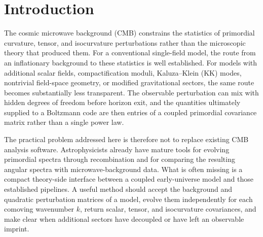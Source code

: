 \documentclass[aps,prd,twocolumn,superscriptaddress,nofootinbib,longbibliography,floatfix]{revtex4-2}
\begin{document}
\maketitle

\section{Introduction}
The cosmic microwave background (CMB) constrains the statistics of primordial curvature, tensor, and isocurvature perturbations rather than the microscopic theory that produced them.  For a conventional single-field model, the route from an inflationary background to these statistics is well established.  For models with additional scalar fields, compactification moduli, Kaluza--Klein (KK) modes, nontrivial field-space geometry, or modified gravitational sectors, the same route becomes substantially less transparent.  The observable perturbation can mix with hidden degrees of freedom before horizon exit, and the quantities ultimately supplied to a Boltzmann code are then entries of a coupled primordial covariance matrix rather than a single power law.

The practical problem addressed here is therefore not to replace existing CMB analysis software.  Astrophysicists already have mature tools for evolving primordial spectra through recombination and for comparing the resulting angular spectra with microwave-background data.  What is often missing is a compact theory-side interface between a coupled early-universe model and those established pipelines.  A useful method should accept the background and quadratic perturbation matrices of a model, evolve them independently for each comoving wavenumber $k$, return scalar, tensor, and isocurvature covariances, and make clear when additional sectors have decoupled or have left an observable imprint.
\end{document}
